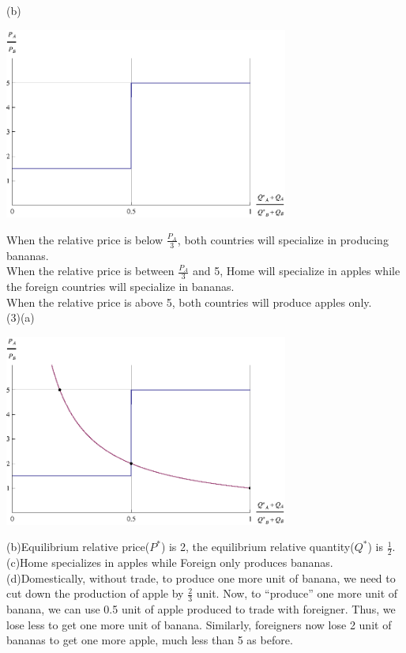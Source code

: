 \documentclass{article}
\begin{document}
\begin{description}
\begin{center}
            \end{center}
           (b)
           \begin{center}
                 \includegraphics[angle=0, width=0.7\textwidth]{ECON3610A13}
           \end{center}
            When the relative price is below $\frac{P_A}{3}$, both countries will specialize in producing bananas.\\ When the relative price is between $\frac{P_A}{3}$ and 5, Home will specialize in apples while the foreign countries will specialize in bananas.\\
            When the relative price is above 5, both countries will produce apples only. \\
        (3)(a)
            \begin{center}
                    \includegraphics[angle=0, width=0.7\textwidth]{ECON3610A14}\\
            \end{center}
           (b)Equilibrium relative price($P^*$) is 2, the equilibrium relative quantity($Q^*$) is $\frac{1}{2}$.\\
           (c)Home specializes in apples while Foreign only produces bananas.\\
           (d)Domestically, without trade, to produce one more unit of banana, we need to cut down the production of apple by $\frac{2}{3}$ unit. Now, to ``produce'' one more unit of banana, we can use 0.5 unit of apple produced to trade with foreigner. Thus, we lose less to get one more unit of banana. Similarly, foreigners now lose 2 unit of bananas to get one more apple, much less than 5 as before.  \\

\end{description}
\end{document}
